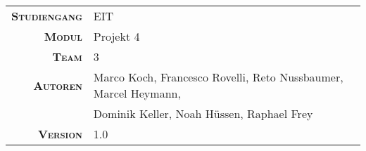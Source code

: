 \begin{titlepage}

    \maketitle

    \vspace{60mm}

    \begin{tabular}{r|l}

        \textsc{\textbf{Studiengang}}
        & EIT\\
        [4mm]

        \textsc{\textbf{Modul}}
        & Projekt 4 \\
        [4mm]

        \textsc{\textbf{Team}}
        & 3 \\
        [4mm]

        \textsc{\textbf{Autoren}}
        & Marco Koch, Francesco Rovelli, Reto Nussbaumer, Marcel Heymann, \\
        & Dominik Keller, Noah H\"ussen, Raphael Frey\\
        [4mm]

        \textsc{\textbf{Version}}
        & 1.0 \\
    \end{tabular}

\end{titlepage}

